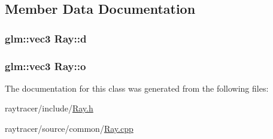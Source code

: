 \subsection{Member Data Documentation}
\hypertarget{class_ray_a72dcc3f5854ae9cdfeeceb880ea2caea}{
\subsubsection[{d}]{\setlength{\rightskip}{0pt plus 5cm}glm\-::vec3 Ray\-::d}}\label{class_ray_a72dcc3f5854ae9cdfeeceb880ea2caea}
\hypertarget{class_ray_afc372b46d562bbe01c1aebc1c3076710}{
\subsubsection[{o}]{\setlength{\rightskip}{0pt plus 5cm}glm\-::vec3 Ray\-::o}}\label{class_ray_afc372b46d562bbe01c1aebc1c3076710}


The documentation for this class was generated from the following files\-:\begin{DoxyCompactItemize}
\item 
raytracer/include/\hyperlink{_ray_8h}{Ray.\-h}\item 
raytracer/source/common/\hyperlink{_ray_8cpp}{Ray.\-cpp}\end{DoxyCompactItemize}
